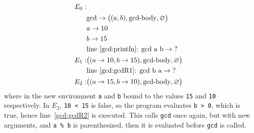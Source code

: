 \begin{align*}
  E_0:&\\
      & \text{gcd} \rightarrow \big((a, b), \text{gcd-body}, \varnothing\big)\\
      & a \rightarrow 10\\
      & b \rightarrow 15\\
      & \text{line~\ref{gcd:printfn}: gcd a b} \rightarrow \text{?}\\
  E_1:& \big((a \rightarrow 10, b \rightarrow 15), \text{gcd-body}, \varnothing\big)\\
      & \text{line~\ref{gcd:gcdR1}: gcd b a} \rightarrow \text{?}\\
  E_2:& \big((a \rightarrow 15, b \rightarrow 10), \text{gcd-body}, \varnothing\big)\\
\end{align*}
where in the new environment \lstinline!a! and \lstinline!b! bound to the values \lstinline!15! and \lstinline!10! respectively. In $E_2$, \lstinline!10 < 15! is false, so the program evaluates \lstinline!b > 0!, which is true, hence line~\ref{gcd:gcdR2} is executed. This calls \lstinline!gcd! once again, but with new arguments, and \lstinline{a % b} is parenthesized, then it is evaluated before \lstinline!gcd! is called. 

